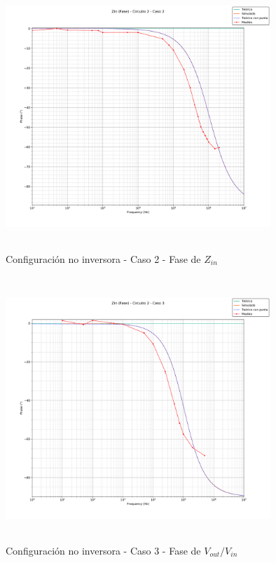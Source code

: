 \begin{figure}[H] %
	\centering
	\includegraphics[width=10cm,height=10cm,keepaspectratio]{../EJ1/00GRAFICOS/c2c2/c2c2zinFASE.png}
	\caption{Configuración no inversora - Caso 2 - Fase de $Z_{in}$}
	\label{c2c2zinP}
\end{figure}


\begin{figure}[H] %
	\centering
	\includegraphics[width=10cm,height=10cm,keepaspectratio]{../EJ1/00GRAFICOS/c2c3/c2c3zinFASE.png}
	\caption{Configuración no inversora - Caso 3 - Fase de $V_{out}/V_{in}$}
	\label{c2c3zinP}
\end{figure}




















